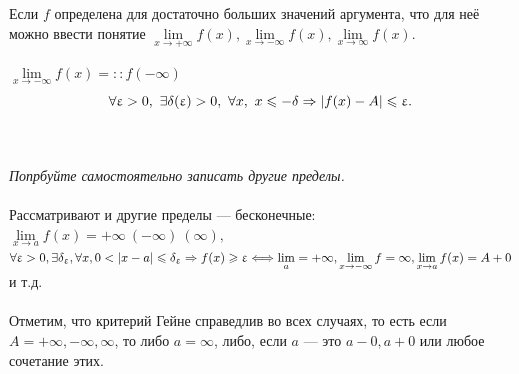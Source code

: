 Если $f$ определена для достаточно больших значений аргумента, что для неё можно ввести понятие $\lim\limits_{x\to+\infty}f(x), \lim\limits_{x\to-\infty}f(x), \lim\limits_{x\to\infty}f(x).$\\
\begin{example}
	$\lim\limits_{x\to-\infty}f(x)=::f(-\infty)$\\
	$$\forall\varepsilon>0,\ \exists\delta(\varepsilon)>0,\ \forall x,\ x\leqslant-\delta\Ra|f(x)-A|\leqslant\varepsilon.$$
\end{example}\\\\
\textit{Попрбуйте самостоятельно записать другие пределы.}\\\\
Рассматривают и другие пределы --- бесконечные:\\
$\lim\limits_{x\to a}f(x)=+\infty\ (-\infty)\ (\infty),$\\
$\forall\varepsilon>0,\exists\delta_\varepsilon,\forall x, 0<|x-a|\leqslant\delta_\varepsilon\Ra f(x)\geqslant\varepsilon\lra\lim\limits_a=+\infty, \lim\limits_{x\to-\infty}f=\infty,\lim\limits_{x\to a}f(x)=A+0$ и т.д.\\\\
Отметим, что критерий Гейне справедлив во всех случаях, то есть если $A=+\infty,-\infty,\infty$, то либо $a=\infty$, либо, если $a$ --- это $a-0,a+0$ или любое сочетание этих.
